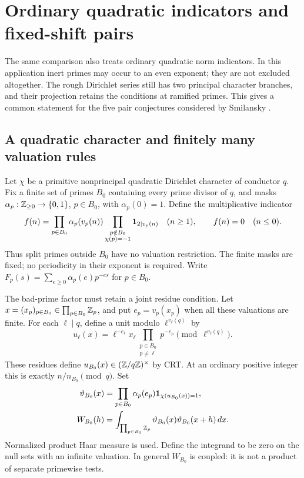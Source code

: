 \section{Ordinary quadratic indicators and fixed-shift pairs}
\label{sec:quadratic-pairs}

The same comparison also treats ordinary quadratic norm indicators.
In this application inert primes may occur to an even exponent; they
are not excluded altogether. The rough Dirichlet series still has
two principal character branches, and their projection retains the
conditions at ramified primes. This gives a common statement for
the five pair conjectures considered by Smilansky
\cite[Sections 6.1 and 6.3]{smilansky}.

\subsection{A quadratic character and finitely many valuation rules}

Let \(\chi\) be a primitive nonprincipal quadratic Dirichlet
character of conductor \(q\). Fix a finite set of primes
\(B_0\) containing every prime divisor of \(q\), and masks
\(\alpha_p:\mathbb Z_{\ge0}\to\{0,1\}\), \(p\in B_0\), with
\(\alpha_p(0)=1\). Define the multiplicative indicator
\[
 f(n)=\prod_{p\in B_0}\alpha_p(v_p(n))
       \prod_{\substack{p\notin B_0\\\chi(p)=-1}}
                                      \mathbf 1_{2\mid v_p(n)}
 \quad(n\ge1),\qquad f(n)=0\quad(n\le0).
\]
Thus split primes outside \(B_0\) have no valuation restriction.
The finite masks are fixed; no periodicity in their exponent is
required. Write \(F_p(s)=\sum_{e\ge0}\alpha_p(e)p^{-es}\)
for \(p\in B_0\).

The bad-prime factor must retain a joint residue condition. Let
\(x=(x_p)_{p\in B_0}\in\prod_{p\in B_0}\mathbb Z_p\), and put
\(e_p=v_p(x_p)\) when all these valuations are finite. For each
\(\ell\mid q\), define a unit modulo \(\ell^{v_\ell(q)}\) by
\[
 u_\ell(x)=\ell^{-e_\ell}x_\ell
            \prod_{\substack{p\in B_0\\p\ne\ell}}p^{-e_p}
                                  \pmod{\ell^{v_\ell(q)}}.
\]
These residues define \(u_{B_0}(x)\in(\mathbb Z/q\mathbb Z)^\times\) by CRT.
At an ordinary positive integer this is exactly
\(n/n_{B_0}\pmod q\). Set
\begin{align}
 \vartheta_{B_0}(x)
   &=\prod_{p\in B_0}\alpha_p(e_p)
                    \mathbf 1_{\chi(u_{B_0}(x))=1},\notag\\
 W_{B_0}(h)
   &=\int_{\prod_{p\in B_0}\mathbb Z_p}
             \vartheta_{B_0}(x)\vartheta_{B_0}(x+h)\,dx.
                                                        \label{eq:quadratic-bad-mass}
\end{align}
Normalized product Haar measure is used. Define the integrand to
be zero on the null sets with an infinite valuation. In general
\(W_{B_0}\) is coupled: it is not a product of separate
primewise tests.

